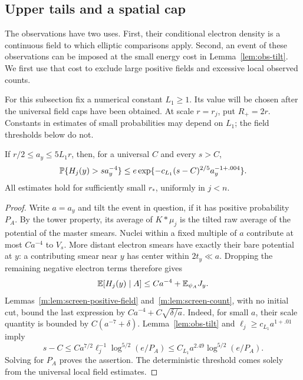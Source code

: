 \subsection{Upper tails and a spatial cap}

The observations have two uses. First, their conditional electron density
is a continuous field to which elliptic comparisons apply. Second, an
event of these observations can be imposed at the small energy cost in
Lemma~\ref{lem:obs-tilt}. We first use that cost to exclude large positive
fields and excessive local observed counts.

For this subsection fix a numerical constant $L_1\ge1$. Its value will be
chosen after the universal field caps have been obtained. At scale
$r=r_j$, put $R_+=2r$. Constants in estimates of small probabilities may
depend on $L_1$; the field thresholds below do not.

\begin{lemma}\label{m:lem:cond-tail}
If $r/2\le a_y\le5L_1r$, then, for a universal $C$ and every $s>C$,
\begin{equation}\label{m:eq:cond-tail}
 \mathbb P\{H_j(y)>s a_y^{-4}\}
 \le e\exp\{-c_{L_1}(s-C)^{2/5}a_y^{-1+.004}\}.
\end{equation}
All estimates hold for sufficiently small $r_*$, uniformly in $j<n$.
\end{lemma}

\begin{proof}
Write $a=a_y$ and tilt the event in question, if it has positive
probability $P_A$. By the tower property, its average of $K*\mu_j$ is
the tilted raw average of the potential of the master smears.
Nuclei within a fixed multiple of $a$ contribute at most $Ca^{-4}$
to $V_s$. More distant electron smears have exactly their bare
potential at $y$: a contributing smear near $y$ has center within
$2t_y\ll a$. Dropping the remaining negative electron terms therefore
gives
\[
 \mathbb E[H_j(y)\mid A]\le Ca^{-4}+\mathbb E_{\psi_A}J_y.
\]
Lemmas~\ref{m:lem:screen-positive-field} and~\ref{m:lem:screen-count}, with
no initial cut, bound the last expression by
$Ca^{-4}+C\sqrt{\delta/a}$. Indeed, for small $a$, their scale quantity
is bounded by $C(a^{-7}+\delta)$. Lemma~\ref{lem:obs-tilt} and
$\ell_j\ge c_{L_1}a^{1+.01}$ imply
\[
 s-C\le C a^{7/2}\ell_j^{-1}\log^{5/2}(e/P_A)
       \le C_{L_1}a^{2.49}\log^{5/2}(e/P_A).
\]
Solving for $P_A$ proves the assertion. The deterministic threshold
comes solely from the universal local field estimates.
\end{proof}

